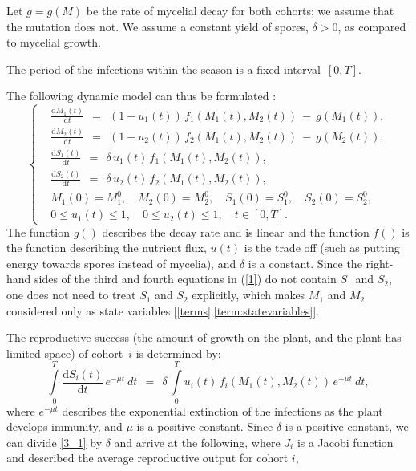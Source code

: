 \documentclass[11pt]{amsart}
\begin{document}
Let $ g = g(M) $ be the rate of mycelial decay for both cohorts; we assume that the mutation does not. We assume a constant yield of spores, $ \delta > 0 $, as compared to mycelial growth. 

The period of the infections within the season is a fixed interval~$ [0, T] $.

The following dynamic model can thus be formulated 
\cite{YegorovGrognardMailleretHalkettBernhard2019}:
\begin{equation}
\left\{ \begin{aligned}
& \frac{\mathrm{d} M_1(t)}{\mathrm{d} t} \:\: = \:\: \left(1 - u_1(t)\right) \,
  f_1\left(M_1(t), M_2(t)\right) \: - \: g\left(M_1(t)\right), \\
& \frac{\mathrm{d} M_2(t)}{\mathrm{d} t} \:\: = \:\: \left(1 - u_2(t)\right) \,
  f_2\left(M_1(t), M_2(t)\right) \: - \: g\left(M_2(t)\right), \\
& \frac{\mathrm{d} S_1(t)}{\mathrm{d} t} \:\: = \:\: \delta \, u_1(t) \,
  f_1\left(M_1(t), M_2(t)\right), \\
& \frac{\mathrm{d} S_2(t)}{\mathrm{d} t} \:\: = \:\: \delta \, u_2(t) \,
  f_2\left(M_1(t), M_2(t)\right), \\
& M_1(0) = M_1^0, \quad M_2(0) = M_2^0, \quad S_1(0) = S_1^0,
  \quad S_2(0) = S_2^0, \\
& 0 \leqslant u_1(t) \leqslant 1, \quad 0 \leqslant u_2(t) \leqslant 1,
  \quad t \in [0, T].
\end{aligned} \right.  \label{1}
\end{equation}
The function $g()$ describes the decay rate and is linear and the function $f()$ is the function describing the nutrient flux, $u(t)$ is the trade off (such as putting energy towards spores instead of mycelia), and $\delta$ is a constant.
Since the right-hand sides of the third and fourth equations in (\ref{1}) do
not contain $ S_1 $ and $ S_2 $, one does not need to treat $ S_1 $ and $ S_2 $
explicitly, which makes $ M_1 $ and $ M_2 $ considered only as state variables [\ref{terms}.\ref{term:statevariables}].

The reproductive success (the amount of growth on the plant, and the plant has limited space) of cohort~$ i $ is determined by:
\begin{equation}
\int\limits_0^T \frac{\mathrm{d} S_i(t)}{\mathrm{d} t} \, e^{-\mu t}
    \: dt \:\: = \:\: \delta \,
\int\limits_0^T u_i(t) \, f_i\left(M_1(t), M_2(t)\right) \, e^{-\mu t} \: dt,  \label{3_1}
\end{equation}
where $ e^{-\mu t} $ describes the exponential extinction of the infections as the plant develops immunity,
and $ \mu $ is a positive constant. Since $ \delta $ is a positive constant,
we can divide \cref{3_1} by $ \delta $ and arrive at the following, where $J_i$ is a Jacobi function and described the average reproductive output for cohort $i$, 
\end{document}
